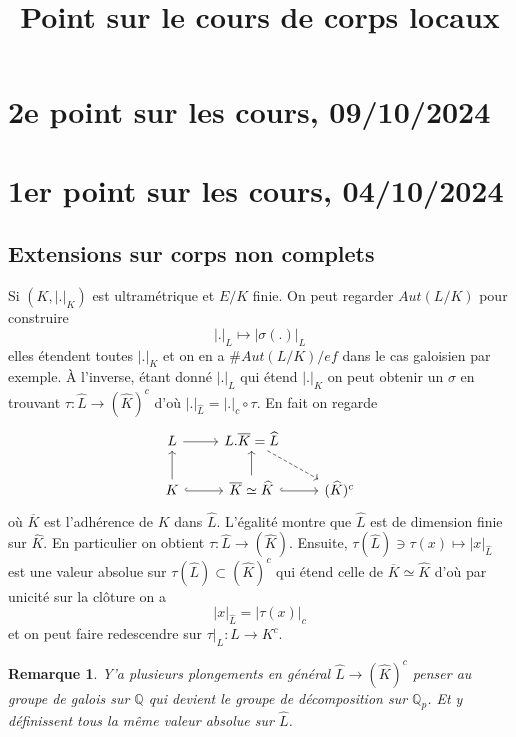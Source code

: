 \documentclass[a4paper,12pt]{book}
\title{Point sur le cours de corps locaux }
\date{}
\newcommand{\Q}{\mathbb{Q}}
\theoremstyle{plain}
\newtheorem{rem}{Remarque}
\theoremstyle{definition}
\theoremstyle{remark}
\begin{document}
\maketitle

\section{2e point sur les cours, 09/10/2024}


\section{1er point sur les cours, 04/10/2024}
\subsection{Extensions sur corps non complets}
Si $(K, |.|_K)$ est ultramétrique et $E/K$ finie. On peut regarder
$Aut(L/K)$ pour construire
\[|.|_L\mapsto |\sigma(.)|_L\]
elles étendent toutes $|.|_K$ et on en a $\#Aut(L/K)/ef$ dans le cas
galoisien par exemple. À l'inverse, 
étant donné $|.|_L$ qui étend $|.|_K$ on peut obtenir un $\sigma$ en
trouvant $\tau\colon \widehat L\to (\widehat{K})^c$ d'où
$|.|_{\widehat L}= |.|_c\circ\tau$. En fait on regarde 
\[\begin{tikzcd}
	L & {L.\overline K=\widehat L} \\
	K & {\overline K\simeq \widehat K} & {(\widehat K)^c}
	\arrow[from=1-1, to=1-2]
	\arrow[dashed, from=1-2, to=2-3]
	\arrow[from=2-1, to=1-1]
	\arrow[hook, from=2-1, to=2-2]
	\arrow[from=2-2, to=1-2]
	\arrow[hook, from=2-2, to=2-3]
\end{tikzcd}\]
où $\overline K$ est l'adhérence de $K$ dans $\widehat L$. L'égalité
montre que $\widehat L$ est de dimension finie sur $\widehat K$. En
particulier on obtient $\tau \colon \widehat L\to (\widehat K)$. Ensuite,
$\tau(\widehat L)\ni\tau(x)\mapsto |x|_{\widehat L}$ est une valeur 
absolue sur $\tau(\widehat L)\subset (\widehat K)^c$ qui étend celle
de $\overline K\simeq \widehat K$ d'où par unicité sur la clôture on a
\[|x|_{\widehat L}=|\tau(x)|_c\]
et on peut faire redescendre sur $\tau|_L\colon L\to K^c$. 
\begin{rem}
    Y'a plusieurs plongements en général $\widehat L \to (\widehat K)^c$
    penser au groupe de galois sur $\Q$ qui devient le groupe de 
    décomposition sur $\Q_p$. Et y définissent tous la même valeur
    absolue sur $\widehat L$.
\end{rem}
\end{document}
